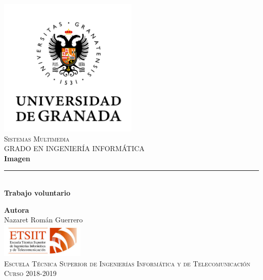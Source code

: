 \documentclass[11pt,a4paper]{article}
\begin{document}
\begin{titlepage}

\begin{minipage}{\textwidth}

\centering
\includegraphics[width=0.5\textwidth]{logo.png}\\

\textsc{\Large Sistemas Multimedia\\[0.2cm]}
\textsc{GRADO EN INGENIERÍA INFORMÁTICA}\\[1cm]

{\Huge\bfseries Imagen\\}
\noindent\rule[-1ex]{\textwidth}{3pt}\\[3.5ex]
{\large\bfseries Trabajo voluntario}
\end{minipage}

\vspace{1.5cm}
\begin{minipage}{\textwidth}
\centering

\textbf{Autora}\\ {Nazaret Román Guerrero}\\[2.5ex]
\includegraphics[width=0.3\textwidth]{etsiit.jpeg}\\[0.1cm]
\vspace{1cm}
\textsc{Escuela Técnica Superior de Ingenierías Informática y de Telecomunicación}\\
\vspace{1cm}
\textsc{Curso 2018-2019}
\end{minipage}
\end{titlepage}

\tableofcontents
\thispagestyle{empty}
\end{document}
